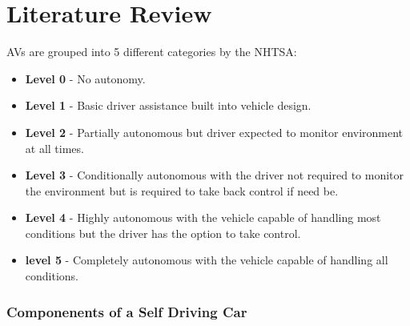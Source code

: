 \let\textcircled=\pgftextcircled



\chapter{Literature Review}
\label{chap:lit_review}


AVs are grouped into 5 different categories by the NHTSA:
\begin{itemize}
	\item \textbf{Level 0} - No autonomy. 
	\item \textbf{Level 1} - Basic driver assistance built into vehicle design.
	\item \textbf{Level 2} - Partially autonomous but driver expected to monitor environment at all times.
	\item \textbf{Level 3} - Conditionally autonomous with the driver not required to monitor the environment but is required to take back control if need be.
	\item \textbf{Level 4} - Highly autonomous with the vehicle capable of handling most conditions but the driver has the option to take control. 
	\item \textbf{level 5} - Completely autonomous with the vehicle capable of handling all conditions.
\end{itemize}


\subsection{Componenents of a Self Driving Car}

